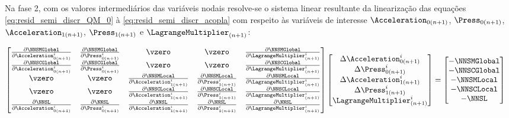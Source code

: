 Na fase 2, com os valores intermediários das variáveis nodais resolve-se o sistema linear resultante da linearização das equações \autoref{eq:resid_semi_discr_QM_0} à \autoref{eq:resid_semi_discr_acopla} com respeito às variáveis de interesse $\Acceleration_{0(n+1)}$, $\Press_{0(n+1)}$,  $\Acceleration_{1(n+1)}$, $\Press_{1(n+1)}$ e $\LagrangeMultiplier_{(n+1)}$:

\begin{align}
	\begin{bmatrix}
		\frac{\partial\NNSMGlobal}{\partial\Acceleration_{0(n+1)}^{i}} & \frac{\partial\NNSMGlobal}{\partial\Press_{0(n+1)}^{i}} & \vzero & \vzero & \frac{\partial\NNSMGlobal}{\partial\LagrangeMultiplier_{(n+1)}^{i}} \\
		\frac{\partial\NNSCGlobal}{\partial\Acceleration_{0(n+1)}^{i}} & \frac{\partial\NNSCGlobal}{\partial\Press_{0(n+1)}^{i}} & \vzero & \vzero & \frac{\partial\NNSCGlobal}{\partial\LagrangeMultiplier_{(n+1)}^{i}} \\
		 \vzero & \vzero & \frac{\partial\NNSMLocal}{\partial\Acceleration_{1(n+1)}^{i}} & \frac{\partial\NNSMLocal}{\partial\Press_{1(n+1)}^{i}} & \frac{\partial\NNSMLocal}{\partial\LagrangeMultiplier_{(n+1)}^{i}} \\
		 \vzero & \vzero & \frac{\partial\NNSCLocal}{\partial\Acceleration_{1(n+1)}^{i}} & \frac{\partial\NNSCLocal}{\partial\Press_{1(n+1)}^{i}} & \frac{\partial\NNSCLocal}{\partial\LagrangeMultiplier_{(n+1)}^{i}} \\
		  \frac{\partial\NNSL}{\partial\Acceleration_{0(n+1)}^{i}} & \frac{\partial\NNSL}{\partial\Press_{0(n+1)}^{i}} & \frac{\partial\NNSL}{\partial\Acceleration_{1(n+1)}^{i}} & \frac{\partial\NNSL}{\partial\Press_{1(n+1)}^{i}} & \frac{\partial\NNSL}{\partial\LagrangeMultiplier_{(n+1)}^{i}}
	\end{bmatrix}
	\begin{bmatrix}
		\Delta\Acceleration_{0(n+1)}^{i} \\
		\Delta\Press_{0(n+1)}^{i} \\
		\Delta\Acceleration_{1(n+1)}^{i} \\
		\Delta\Press_{1(n+1)}^{i} \\
		\LagrangeMultiplier_{(n+1)}^{i}
	\end{bmatrix}
	&=
	\begin{bmatrix}
		-\NNSMGlobal \\
		-\NNSCGlobal \\
		-\NNSMLocal \\
		-\NNSCLocal \\
		-\NNSL
	\end{bmatrix}
	\label{eq:sistema_linear_Arlq}
\end{align}	

